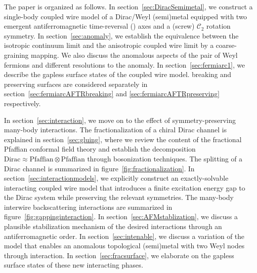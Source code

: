 The paper is organized as follows. In section~\ref{sec:DiracSemimetal}, we construct a single-body coupled wire model of a Dirac/Weyl (semi)metal equipped with two emergent antiferromagnetic time-reversal (\AFTR) axes and a (screw) $\mathcal{C}_2$ rotation symmetry. In section~\ref{sec:anomaly}, we establish the equivalence between the isotropic continuum limit and the anisotropic coupled wire limit by a coarse-graining mapping. We also discuss the anomalous aspects of the pair of Weyl fermions and different resolutions to the anomaly. In section~\ref{sec:fermiarc1}, we describe the gapless surface states of the coupled wire model. \AFTR breaking and preserving surfaces are considered separately in section~\ref{sec:fermiarcAFTRbreaking} and \ref{sec:fermiarcAFTRpreserving} respectively.

In section~\ref{sec:interaction}, we move on to the effect of symmetry-preserving many-body interactions. The fractionalization of a chiral Dirac channel is explained in section~\ref{sec:gluing}, where we review the content of the fractional Pfaffian conformal field theory and establish the decomposition $\mathrm{Dirac}\approx\mathrm{Pfaffian}\otimes\mathrm{Pfaffian}$ through bosonization techniques. The splitting of a Dirac channel is summarized in figure~\ref{fig:fractionalization}. In section~\ref{sec:interactionmodels}, we explicitly construct an exactly-solvable interacting coupled wire model that introduces a finite excitation energy gap to the Dirac system while preserving the relevant symmetries. The many-body interwire backscattering interactions are summarized in figure~\ref{fig:gappinginteraction}. In section~\ref{sec:AFMstablization}, we discuss a plausible stabilization mechanism of the desired interactions through an antiferromagnetic order. In section~\ref{sec:intenable}, we discuss a variation of the model that enables an anomalous topological (semi)metal with two Weyl nodes through interaction. In section~\ref{sec:fracsurface}, we elaborate on the gapless surface states of these new interacting phases.


